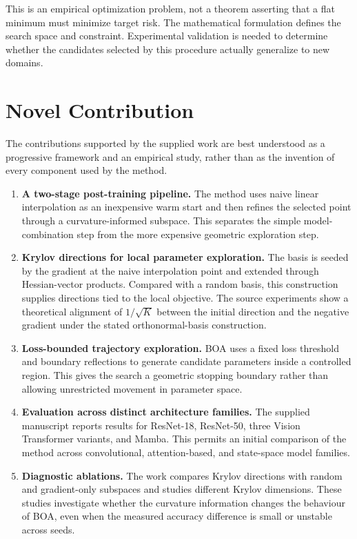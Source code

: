 \documentclass[11pt,a4paper]{article}
\begin{document}
This is an empirical optimization problem, not a theorem asserting that a flat minimum must minimize target risk. The mathematical formulation defines the search space and constraint. Experimental validation is needed to determine whether the candidates selected by this procedure actually generalize to new domains.

\section{Novel Contribution}

The contributions supported by the supplied work are best understood as a progressive framework and an empirical study, rather than as the invention of every component used by the method.

\begin{enumerate}
 \item \textbf{A two-stage post-training pipeline.} The method uses naive linear interpolation as an inexpensive warm start and then refines the selected point through a curvature-informed subspace. This separates the simple model-combination step from the more expensive geometric exploration step.
 \item \textbf{Krylov directions for local parameter exploration.} The basis is seeded by the gradient at the naive interpolation point and extended through Hessian-vector products. Compared with a random basis, this construction supplies directions tied to the local objective. The source experiments show a theoretical alignment of $1/\sqrt{K}$ between the initial direction and the negative gradient under the stated orthonormal-basis construction.
 \item \textbf{Loss-bounded trajectory exploration.} BOA uses a fixed loss threshold and boundary reflections to generate candidate parameters inside a controlled region. This gives the search a geometric stopping boundary rather than allowing unrestricted movement in parameter space.
 \item \textbf{Evaluation across distinct architecture families.} The supplied manuscript reports results for ResNet-18, ResNet-50, three Vision Transformer variants, and Mamba. This permits an initial comparison of the method across convolutional, attention-based, and state-space model families.
 \item \textbf{Diagnostic ablations.} The work compares Krylov directions with random and gradient-only subspaces and studies different Krylov dimensions. These studies investigate whether the curvature information changes the behaviour of BOA, even when the measured accuracy difference is small or unstable across seeds.
\end{enumerate}
\end{document}
